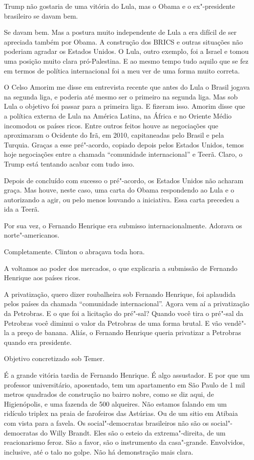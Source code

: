 \falaG Trump não gostaria de uma vitória do Lula, mas o Obama e o
ex"-presidente brasileiro se davam bem.

\falaM Se davam bem. Mas a postura muito independente de Lula a era difícil
de ser apreciada também por Obama. A construção dos BRICS e outras
situações não poderiam agradar os Estados Unidos. O Lula, outro exemplo,
foi a Israel e tomou uma posição muito clara pró-Palestina. E ao mesmo
tempo tudo aquilo que se fez em termos de política internacional foi a
meu ver de uma forma muito correta.

\falaG O Celso Amorim me disse em entrevista recente que antes do Lula o
Brasil jogava na segunda liga, e poderia até mesmo ser o primeiro na
segunda liga. Mas sob Lula o objetivo foi passar para a primeira liga. E
fizeram isso. Amorim disse que a política externa de Lula na América
Latina, na África e no Oriente Médio incomodou os países ricos. Entre
outros feitos houve as negociações que aproximaram o Ocidente do Irã, em
2010, capitaneadas pelo Brasil e pela Turquia. Graças a esse pré"-acordo,
copiado depois pelos Estados Unidos, temos hoje negociações entre a
chamada ``comunidade internacional'' e Teerã. Claro, o Trump está
tentando acabar com tudo isso.

\falaM Depois de concluído com sucesso o pré"-acordo, os Estados Unidos não
acharam graça. Mas houve, neste caso, uma carta do Obama respondendo ao
Lula e o autorizando a agir, ou pelo menos louvando a iniciativa. Essa
carta precedeu a ida a Teerã.

\falaG Por sua vez, o Fernando Henrique era submisso internacionalmente.
Adorava os norte"-americanos.

\falaM Completamente. Clinton o abraçava toda hora.

\falaG A voltamos ao poder dos mercados, o que explicaria a submissão de
Fernando Henrique aos países ricos.

\falaM A privatização, quero dizer roubalheira sob Fernando Henrique, foi
aplaudida pelos países da chamada ``comunidade internacional''. Agora
vem aí a privatização da Petrobras. E o que foi a licitação do pré"-sal?
Quando você tira o pré"-sal da Petrobras você diminui o valor da
Petrobras de uma forma brutal. E vão vendê"-la a preço de banana. Aliás,
o Fernando Henrique queria privatizar a Petrobras quando era presidente.

\falaG Objetivo concretizado sob Temer.

\falaM É a grande vitória tardia de Fernando Henrique. É algo assustador. E
por que um professor universitário, aposentado, tem um apartamento em
São Paulo de 1 mil metros quadrados de construção no bairro nobre, como
se diz aqui, de Higienópolis, e uma fazenda de 500 alqueires. Não
estamos falando em um ridículo triplex na praia de farofeiros das
Astúrias. Ou de um sitio em Atibaia com vista para a favela. Os
social"-democratas brasileiros não são os social"-democratas do Willy
Brandt. Eles são o esteio da extrema"-direita, de um reacionarismo feroz.
São a favor, são o instrumento da casa"-grande. Envolvidos, inclusive,
até o talo no golpe. Não há demonstração mais clara.

